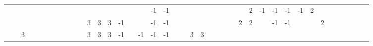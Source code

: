 \begin{table}[H]
{\begin{tabular}{ccccccccccccccccccccccccccccccccccccccccc}
   &    &                           &                           &                           &                           &                           &                           &                           &                           &                           &                           &                           &                           &                           &                           &                           & -1                        & -1                        &                           &                           &                           &                           &    &    &    &                           &                           & \cellcolor[HTML]{FE0000}2 & -1                        & -1                        & -1                        & -1                        & \cellcolor[HTML]{FE0000}2 &                           &                           &                           &                           &  &  &  \\
   &    &                           &                           &                           &                           &                           &                           &                           &                           &                           & \cellcolor[HTML]{3531FF}3 & \cellcolor[HTML]{3531FF}3 & \cellcolor[HTML]{3531FF}3 & -1                        &                           &                           & -1                        & -1                        &                           &                           &                           &                           &    &    &    &                           & \cellcolor[HTML]{FE0000}2 & \cellcolor[HTML]{FE0000}2 &                           & -1                        & -1                        &                           &                           & \cellcolor[HTML]{FE0000}2 &                           &                           &                           &  &  &  \\
   &    & \cellcolor[HTML]{3531FF}3 &                           &                           &                           &                           &                           &                           &                           &                           & \cellcolor[HTML]{3531FF}3 & \cellcolor[HTML]{3531FF}3 & \cellcolor[HTML]{3531FF}3 & -1                        &                           & -1                        & -1                        & -1                        &                           &                           & \cellcolor[HTML]{3531FF}3 & \cellcolor[HTML]{3531FF}3 &    &    &    &                           &                           &                           &                           &                           &                           &                           &                           &                           &                           &                           &                           &  &  &  \\

\end{tabular}}
\end{table}
